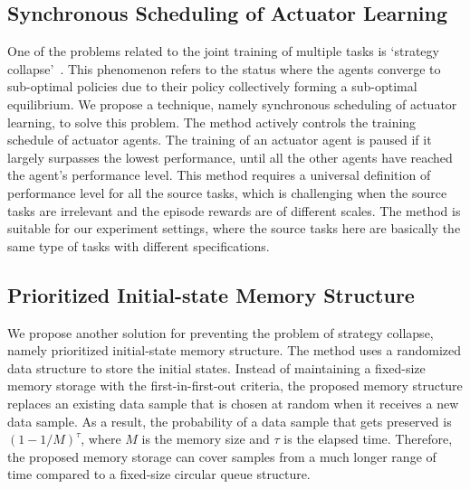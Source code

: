 \subsection{Synchronous Scheduling of Actuator Learning}
One of the problems related to the joint training of multiple tasks is `strategy collapse'~\cite{openai_2018}. This phenomenon refers to the status where the agents converge to sub-optimal policies due to their policy collectively forming a sub-optimal equilibrium. We propose a technique, namely synchronous scheduling of actuator learning, to solve this problem. The method actively controls the training schedule of actuator agents. The training of an actuator agent is paused if it largely surpasses the lowest performance, until all the other agents have reached the agent's performance level. This method requires a universal definition of performance level for all the source tasks, which is challenging when the source tasks are irrelevant and the episode rewards are of different scales. The method is suitable for our experiment settings, where the source tasks here are basically the same type of tasks with different specifications. 
\subsection{Prioritized Initial-state Memory Structure}
We propose another solution for preventing the problem of strategy collapse, namely prioritized initial-state memory structure. The method uses a randomized data structure to store the initial states. Instead of maintaining a fixed-size memory storage with the first-in-first-out criteria, the proposed memory structure replaces an existing data sample that is chosen at random when it receives a new data sample. As a result, the probability of a data sample that gets preserved is $(1-1/M)^\tau$, where $M$ is the memory size and $\tau$ is the elapsed time. Therefore, the proposed memory storage can cover samples from a much longer range of time compared to a fixed-size circular queue structure.

